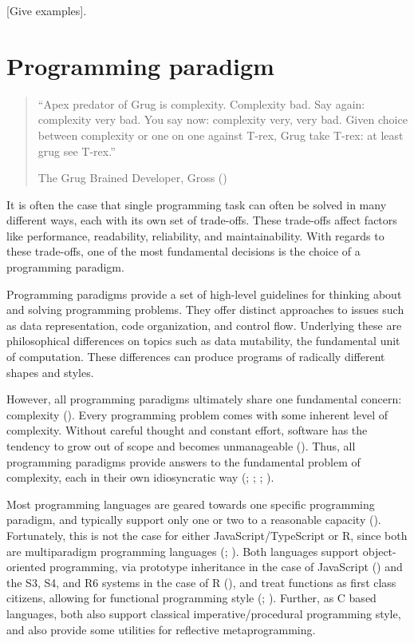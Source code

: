 \documentclass[
]{book}
\theoremstyle{definition}
\theoremstyle{definition}
\theoremstyle{definition}
\theoremstyle{definition}
\theoremstyle{remark}
\begin{document}
{[}Give examples{]}.

\section{Programming paradigm}\label{programming-paradigm}

\begin{quote}
``Apex predator of Grug is complexity. Complexity bad. Say again: complexity very bad.
You say now: complexity very, very bad. Given choice between complexity or one on one
against T-rex, Grug take T-rex: at least grug see T-rex.''

The Grug Brained Developer, Gross ()
\end{quote}

It is often the case that single programming task can often be solved in many different ways, each with its own set of trade-offs. These trade-offs affect factors like performance, readability, reliability, and maintainability. With regards to these trade-offs, one of the most fundamental decisions is the choice of a programming paradigm.

Programming paradigms provide a set of high-level guidelines for thinking about and solving programming problems. They offer distinct approaches to issues such as data representation, code organization, and control flow. Underlying these are philosophical differences on topics such as data mutability, the fundamental unit of computation. These differences can produce programs of radically different shapes and styles.

However, all programming paradigms ultimately share one fundamental concern: complexity (). Every programming problem comes with some inherent level of complexity. Without careful thought and constant effort, software has the tendency to grow out of scope and becomes unmanageable (). Thus, all programming paradigms provide answers to the fundamental problem of complexity, each in their own idiosyncratic way (; ; ; ).

Most programming languages are geared towards one specific programming paradigm, and typically support only one or two to a reasonable capacity (). Fortunately, this is not the case for either JavaScript/TypeScript or R, since both are multiparadigm programming languages (; ). Both languages support object-oriented programming, via prototype inheritance in the case of JavaScript () and the S3, S4, and R6 systems in the case of R (), and treat functions as first class citizens, allowing for functional programming style (; ). Further, as C based languages, both also support classical imperative/procedural programming style, and also provide some utilities for reflective metaprogramming.
\end{document}
